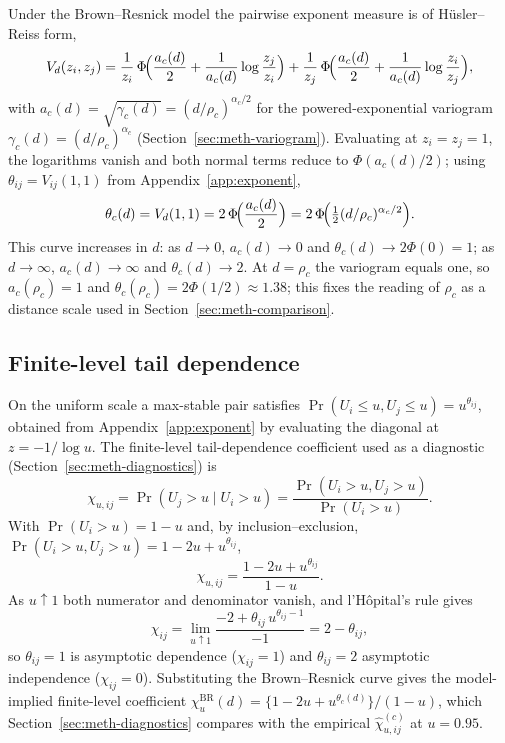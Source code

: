 Under the Brown--Resnick model the pairwise exponent measure is of H\"usler--Reiss form,
\[
    V_d(z_i,z_j)=\frac{1}{z_i}\,\Phi\!\Bigl(\frac{a_c(d)}{2}+\frac{1}{a_c(d)}\log\frac{z_j}{z_i}\Bigr)
    +\frac{1}{z_j}\,\Phi\!\Bigl(\frac{a_c(d)}{2}+\frac{1}{a_c(d)}\log\frac{z_i}{z_j}\Bigr),
\]
with \(a_c(d)=\sqrt{\gamma_c(d)}=(d/\rho_c)^{\alpha_c/2}\) for the powered-exponential variogram \(\gamma_c(d)=(d/\rho_c)^{\alpha_c}\) (Section~\ref{sec:meth-variogram}). Evaluating at \(z_i=z_j=1\), the logarithms vanish and both normal terms reduce to \(\Phi(a_c(d)/2)\); using \(\theta_{ij}=V_{ij}(1,1)\) from Appendix~\ref{app:exponent},
\[
    \theta_c(d)=V_d(1,1)=2\,\Phi\!\Bigl(\frac{a_c(d)}{2}\Bigr)=2\,\Phi\!\Bigl(\tfrac12 (d/\rho_c)^{\alpha_c/2}\Bigr).
\]
This curve increases in \(d\): as \(d\to0\), \(a_c(d)\to0\) and \(\theta_c(d)\to2\Phi(0)=1\); as \(d\to\infty\), \(a_c(d)\to\infty\) and \(\theta_c(d)\to2\). At \(d=\rho_c\) the variogram equals one, so \(a_c(\rho_c)=1\) and \(\theta_c(\rho_c)=2\Phi(1/2)\approx1.38\); this fixes the reading of \(\rho_c\) as a distance scale used in Section~\ref{sec:meth-comparison}.

\subsection{Finite-level tail dependence}\label{app:tail-dependence}

On the uniform scale a max-stable pair satisfies \(\Pr(U_i\le u,U_j\le u)=u^{\theta_{ij}}\), obtained from Appendix~\ref{app:exponent} by evaluating the diagonal at \(z=-1/\log u\). The finite-level tail-dependence coefficient used as a diagnostic (Section~\ref{sec:meth-diagnostics}) is
\[
    \chi_{u,ij}=\Pr(U_j>u\mid U_i>u)=\frac{\Pr(U_i>u,U_j>u)}{\Pr(U_i>u)}.
\]
With \(\Pr(U_i>u)=1-u\) and, by inclusion--exclusion, \(\Pr(U_i>u,U_j>u)=1-2u+u^{\theta_{ij}}\),
\[
    \chi_{u,ij}=\frac{1-2u+u^{\theta_{ij}}}{1-u}.
\]
As \(u\uparrow1\) both numerator and denominator vanish, and l'H\^opital's rule gives
\[
    \chi_{ij}=\lim_{u\uparrow1}\frac{-2+\theta_{ij}\,u^{\theta_{ij}-1}}{-1}=2-\theta_{ij},
\]
so \(\theta_{ij}=1\) is asymptotic dependence (\(\chi_{ij}=1\)) and \(\theta_{ij}=2\) asymptotic independence (\(\chi_{ij}=0\)). Substituting the Brown--Resnick curve gives the model-implied finite-level coefficient \(\chi^{\mathrm{BR}}_{u}(d)=\{1-2u+u^{\theta_c(d)}\}/(1-u)\), which Section~\ref{sec:meth-diagnostics} compares with the empirical \(\widehat\chi_{u,ij}^{(c)}\) at \(u=0.95\).